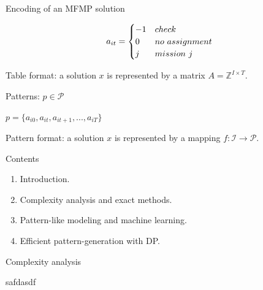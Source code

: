 \documentclass[usenames,dvipsnames]{beamer}
\begin{document}
\begin{frame}

\begin{block}{Encoding of an MFMP solution}

\begin{align}
 a_{it} = 
  \begin{cases} 
   -1 & check \\
   0 & no\,\,assignment \\
   j & mission\,\, j \\
  \end{cases}\notag
\end{align}

Table format: a solution \(x\) is represented by a matrix
\(A = \mathbb{Z}^{I \times T}\).

Patterns: \(p \in \mathcal{P}\)

\(p = \{a_{i0}, a_{it}, a_{it+1}, ..., a_{iT}\}\)

Pattern format: a solution \(x\) is represented by a mapping
\(f: \mathcal{I} \to \mathcal{P}\).

\end{block}

\end{frame}

\begin{frame}

\begin{block}{Contents}

\begin{enumerate}[<+->]

\item
  Introduction.
\item
  Complexity analysis and exact methods.
\item
  Pattern-like modeling and machine learning.
\item
  Efficient pattern-generation with DP.
\end{enumerate}

\end{block}

\end{frame}

\begin{frame}

\begin{block}{Complexity analysis}

safdasdf

\end{block}

\end{frame}
\end{document}
